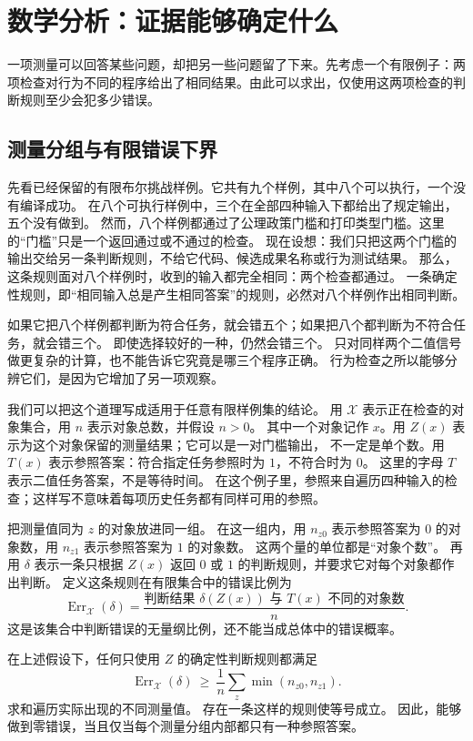 \section{数学分析：证据能够确定什么}
\label{sec:mathematics}

一项测量可以回答某些问题，却把另一些问题留了下来。先考虑一个有限例子：两项检查对行为不同的程序给出了相同结果。由此可以求出，仅使用这两项检查的判断规则至少会犯多少错误。

\subsection{测量分组与有限错误下界}
\label{sec:measurement-classes}

先看已经保留的有限布尔挑战样例。它共有九个样例，其中八个可以执行，一个没有编译成功。
在八个可执行样例中，三个在全部四种输入下都给出了规定输出，五个没有做到。
然而，八个样例都通过了公理政策门槛和打印类型门槛。这里的“门槛”只是一个返回通过或不通过的检查。
现在设想：我们只把这两个门槛的输出交给另一条判断规则，不给它代码、候选成果名称或行为测试结果。
那么，这条规则面对八个样例时，收到的输入都完全相同：两个检查都通过。
一条确定性规则，即“相同输入总是产生相同答案”的规则，必然对八个样例作出相同判断。

如果它把八个样例都判断为符合任务，就会错五个；如果把八个都判断为不符合任务，就会错三个。
即使选择较好的一种，仍然会错三个。
只对同样两个二值信号做更复杂的计算，也不能告诉它究竟是哪三个程序正确。
行为检查之所以能够分辨它们，是因为它增加了另一项观察。

我们可以把这个道理写成适用于任意有限样例集的结论。
用 $\mathcal X$ 表示正在检查的对象集合，用 $n$ 表示对象总数，并假设 $n>0$。
其中一个对象记作 $x$。用 $Z(x)$ 表示为这个对象保留的测量结果；它可以是一对门槛输出，
不一定是单个数。用 $T(x)$ 表示参照答案：符合指定任务参照时为 $1$，不符合时为 $0$。
这里的字母 $T$ 表示二值任务答案，不是等待时间。
在这个例子里，参照来自遍历四种输入的检查；这样写不意味着每项历史任务都有同样可用的参照。

把测量值同为 $z$ 的对象放进同一组。
在这一组内，用 $n_{z0}$ 表示参照答案为 $0$ 的对象数，用 $n_{z1}$ 表示参照答案为 $1$ 的对象数。
这两个量的单位都是“对象个数”。
再用 $\delta$ 表示一条只根据 $Z(x)$ 返回 $0$ 或 $1$ 的判断规则，并要求它对每个对象都作出判断。
定义这条规则在有限集合中的错误比例为
\[
\operatorname{Err}_{\mathcal X}(\delta)
=\frac{\text{判断结果 }\delta(Z(x))\text{ 与 }T(x)\text{ 不同的对象数}}{n}.
\]
这是该集合中判断错误的无量纲比例，还不能当成总体中的错误概率。

\begin{proposition}
\label{prop:measurement}
在上述假设下，任何只使用 $Z$ 的确定性判断规则都满足
\[
\operatorname{Err}_{\mathcal X}(\delta)
\ \ge\ \frac{1}{n}\sum_z\min(n_{z0},n_{z1}).
\]
求和遍历实际出现的不同测量值。
存在一条这样的规则使等号成立。
因此，能够做到零错误，当且仅当每个测量分组内部都只有一种参照答案。
\end{proposition}

